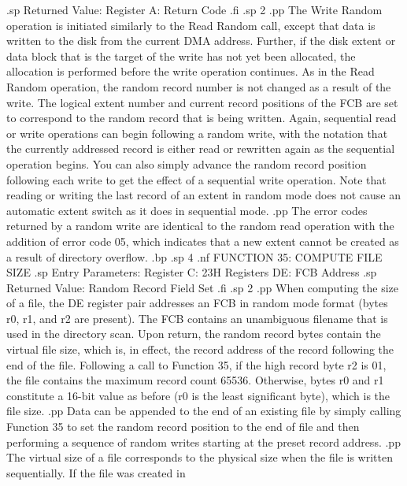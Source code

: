 .sp
                Returned Value:
                     Register  A:  Return Code
.fi
.sp 2
.pp
The Write Random operation is initiated similarly to the Read 
Random call, except that data is written to the disk from the 
current DMA address.  Further, if the disk extent or data block 
that is the target of the write has not yet been allocated, the 
allocation is performed before the write operation continues.  As 
in the Read Random operation, the random record number is not 
changed as a result of the write.  The logical extent number and 
current record positions of the FCB are set to correspond to the 
random record that is being written.  Again, sequential read or 
write operations can begin following a random write, with the 
notation that the currently addressed record is either read or 
rewritten again as the sequential operation begins.  You can 
also simply advance the random record position following each 
write to get the effect of a sequential write operation.  
Note that reading or writing the last record of an extent in 
random mode does not cause an automatic extent switch as it does 
in sequential mode.
.pp
The error codes returned by a random write are identical to the 
random read operation with the addition of error code 05, which 
indicates that a new extent cannot be created as a result of 
directory overflow.
.bp
.sp 4
.nf
                 FUNCTION 35:  COMPUTE FILE SIZE
.sp
                  Entry Parameters:
                        Register C:  23H
                      Registers DE:  FCB Address
.sp
                  Returned Value:
                      Random Record Field Set
.fi
.sp 2
.pp
When computing the size of a file, the DE register pair addresses 
an FCB in random mode format (bytes r0, r1, and r2 are present).  
The FCB contains an unambiguous filename that is used in the 
directory scan.  Upon return, the random record bytes contain the 
virtual file size, which is, in effect, the record address of 
the record following the end of the file.  Following a call to 
Function 35, if the high record byte r2 is 01, the file contains 
the maximum record count 65536.  Otherwise, bytes r0 and r1 
constitute a 16-bit value as before (r0 is the least significant byte), 
which is the file size.
.pp
Data can be appended to the end of an existing file by simply 
calling Function 35 to set the random record position to the end 
of file and then performing a sequence of random writes starting 
at the preset record address.
.pp
The virtual size of a file corresponds to the physical size when 
the file is written sequentially.  If the file was created in 

